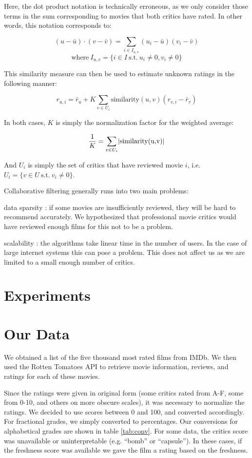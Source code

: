 \documentclass[12pt]{article}
\DeclarePairedDelimiter\abs{\lvert}{\rvert}%
\begin{document}
Here, the dot product notation is technically erroneous, as we only consider
those terms in the sum corresponding to movies that both critics have rated.
In other words, this notation corresponds to:

$$
(u - \bar{u}) \cdot (v - \bar{v}) = \sum_{i \in I_{u,v}} (u_i - \bar{u})(v_i - \bar{v})
$$
$$
\text{where} \  I_{u,v} = \{ i \in I \  \text{s.t.} \   u_i \neq 0, v_i \neq 0 \}
$$

This similarity measure can then be used to estimate unknown ratings in the
following manner:

$$ r_{u,i} = \bar{r}_u + K \sum_{v \in U_i} \text{similarity}(u,v) (r_{v,i}-\bar{r}_v) $$

In both cases, $K$ is simply the normalization factor for the weighted average:

$$ \frac{1}{K} = \sum_{v \in U_i} \abs{\text{similarity(u,v)}} $$

And $U_i$ is simply the set of critics that have reviewed movie $i$, i.e.
$U_i = \{ v \in U \  \text{s.t.} \  v_i \neq 0 \}$.


Collaborative filtering generally runs into two main problems:

data sparsity : if some movies are insufficiently reviewed, they will be hard to recommend accurately. 
We hypothesized that professional movie critics would have reviewed enough films for this not to be a problem.

scalability : the algorithms take linear time in the number of users. In the case of large internet systems this can pose a problem.
This does not affect us as we are limited to a small enough number of critics.



\section{Experiments}

\section{Our Data}

We obtained a list of the five thousand most rated films from IMDb. We then 
used the Rotten Tomatoes API to retrieve movie information, reviews, and 
ratings for each of these movies.  

Since the ratings were given in original form (some critics rated from A-F, 
some from 0-10, and others on more obscure scales), it was necessary to 
normalize the ratings. We decided to use scores between 0 and 100, and converted
accordingly. For fractional grades, we simply converted to percentages. Our 
conversions for alphabetical grades are shown in table \ref{tab:conv}. For some 
data, the critics score was unavailable or uninterpretable (e.g. ``bomb'' or 
``capsule''). In these cases, if the freshness score was available we gave the 
film a rating based on the freshness.
\end{document}
